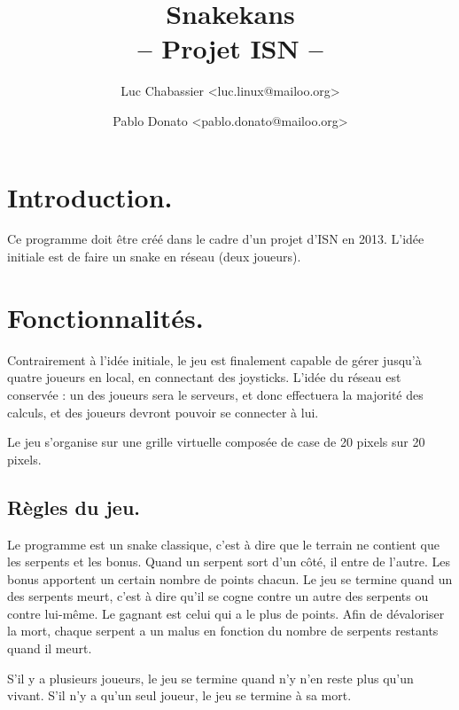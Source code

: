 \documentclass{article}
\title{Snakekans\\-- Projet ISN --}
\author{Luc Chabassier <luc.linux@mailoo.org> \and Pablo Donato <pablo.donato@mailoo.org>}
\begin{document}
\maketitle

\tableofcontents

\section{Introduction.}
Ce programme doit être créé dans le cadre d'un projet d'ISN en 2013. L'idée initiale est de faire un snake en réseau (deux joueurs).

\section{Fonctionnalités.}
Contrairement à l'idée initiale, le jeu est finalement capable de gérer jusqu'à quatre joueurs en local, en connectant des joysticks. L'idée du réseau est conservée : un des joueurs sera le serveurs, et donc effectuera la majorité des calculs, et des joueurs devront pouvoir se connecter à lui.

Le jeu s'organise sur une grille virtuelle composée de case de 20 pixels sur 20 pixels.

\subsection{Règles du jeu.}
Le programme est un snake classique, c'est à dire que le terrain ne contient que les serpents et les bonus. Quand un serpent sort d'un côté, il entre de l'autre. Les bonus apportent un certain nombre de points chacun. Le jeu se termine quand un des serpents meurt, c'est à dire qu'il se cogne contre un autre des serpents ou contre lui-même. Le gagnant est celui qui a le plus de points. Afin de dévaloriser la mort, chaque serpent a un malus en fonction du nombre de serpents restants quand il meurt.

S'il y a plusieurs joueurs, le jeu se termine quand n'y n'en reste plus qu'un vivant. S'il n'y a qu'un seul joueur, le jeu se termine à sa mort.
\end{document}
